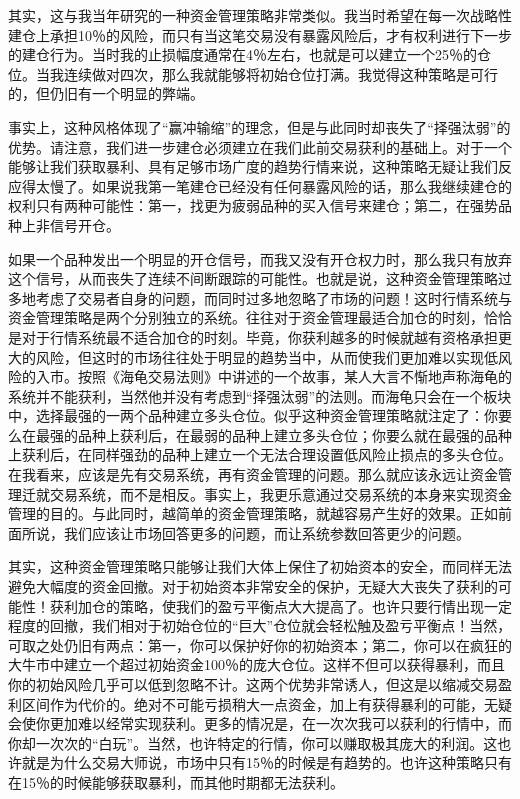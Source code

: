 其实，这与我当年研究的一种资金管理策略非常类似。我当时希望在每一次战略性建仓上承担10％的风险，而只有当这笔交易没有暴露风险后，才有权利进行下一步的建仓行为。当时我的止损幅度通常在4％左右，也就是可以建立一个25％的仓位。当我连续做对四次，那么我就能够将初始仓位打满。我觉得这种策略是可行的，但仍旧有一个明显的弊端。

事实上，这种风格体现了“赢冲输缩”的理念，但是与此同时却丧失了“择强汰弱”的优势。请注意，我们进一步建仓必须建立在我们此前交易获利的基础上。对于一个能够让我们获取暴利、具有足够市场广度的趋势行情来说，这种策略无疑让我们反应得太慢了。如果说我第一笔建仓已经没有任何暴露风险的话，那么我继续建仓的权利只有两种可能性：第一，找更为疲弱品种的买入信号来建仓；第二，在强势品种上非信号开仓。

如果一个品种发出一个明显的开仓信号，而我又没有开仓权力时，那么我只有放弃这个信号，从而丧失了连续不间断跟踪的可能性。也就是说，这种资金管理策略过多地考虑了交易者自身的问题，而同时过多地忽略了市场的问题！这时行情系统与资金管理策略是两个分别独立的系统。往往对于资金管理最适合加仓的时刻，恰恰是对于行情系统最不适合加仓的时刻。毕竟，你获利越多的时候就越有资格承担更大的风险，但这时的市场往往处于明显的趋势当中，从而使我们更加难以实现低风险的入市。按照《海龟交易法则》中讲述的一个故事，某人大言不惭地声称海龟的系统并不能获利，当然他并没有考虑到“择强汰弱”的法则。而海龟只会在一个板块中，选择最强的一两个品种建立多头仓位。似乎这种资金管理策略就注定了：你要么在最强的品种上获利后，在最弱的品种上建立多头仓位；你要么就在最强的品种上获利后，在同样强劲的品种上建立一个无法合理设置低风险止损点的多头仓位。在我看来，应该是先有交易系统，再有资金管理的问题。那么就应该永远让资金管理迁就交易系统，而不是相反。事实上，我更乐意通过交易系统的本身来实现资金管理的目的。与此同时，越简单的资金管理策略，就越容易产生好的效果。正如前面所说，我们应该让市场回答更多的问题，而让系统参数回答更少的问题。

其实，这种资金管理策略只能够让我们大体上保住了初始资本的安全，而同样无法避免大幅度的资金回撤。对于初始资本非常安全的保护，无疑大大丧失了获利的可能性！获利加仓的策略，使我们的盈亏平衡点大大提高了。也许只要行情出现一定程度的回撤，我们相对于初始仓位的“巨大”仓位就会轻松触及盈亏平衡点！当然，可取之处仍旧有两点：第一，你可以保护好你的初始资本；第二，你可以在疯狂的大牛市中建立一个超过初始资金100％的庞大仓位。这样不但可以获得暴利，而且你的初始风险几乎可以低到忽略不计。这两个优势非常诱人，但这是以缩减交易盈利区间作为代价的。绝对不可能亏损稍大一点资金，加上有获得暴利的可能，无疑会使你更加难以经常实现获利。更多的情况是，在一次次我可以获利的行情中，而你却一次次的“白玩”。当然，也许特定的行情，你可以赚取极其庞大的利润。这也许就是为什么交易大师说，市场中只有15％的时候是有趋势的。也许这种策略只有在15％的时候能够获取暴利，而其他时期都无法获利。

